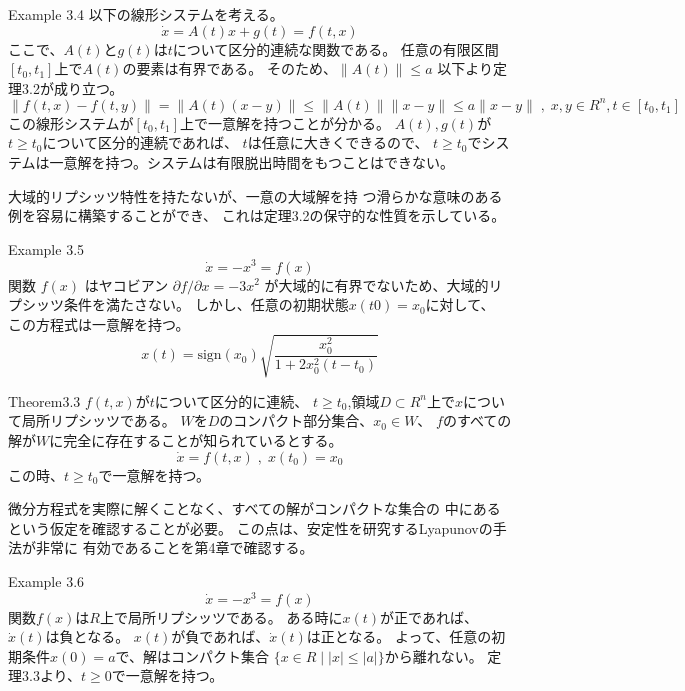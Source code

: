 \documentclass{jsarticle}
\begin{document}
Example 3.4
以下の線形システムを考える。
\begin{equation*}
  \dot x = A(t)x + g(t)=f(t,x)
\end{equation*}
ここで、$A(t)$と$g(t)$は$t$について区分的連続な関数である。
任意の有限区間$[t_0,t_1]$上で$A(t)$の要素は有界である。
そのため、$\|A(t)\|\leq a$
以下より定理3.2が成り立つ。
\begin{equation*}
  \|f(t,x)-f(t,y)\|=\|A(t)(x-y)\|\leq \|A(t)\|\|x-y\|\leq a\|x-y\|
  \;,\;x,y \in R^n,t\in [t_0,t_1]
\end{equation*}
この線形システムが$[t_0,t_1]$上で一意解を持つことが分かる。
$A(t),g(t)$が$t\geq t_0$について区分的連続であれば、
$t$は任意に大きくできるので、
$t\geq t_0$でシステムは一意解を持つ。システムは有限脱出時間をもつことはできない。

大域的リプシッツ特性を持たないが、一意の大域解を持
つ滑らかな意味のある例を容易に構築することができ、
これは定理3.2の保守的な性質を示している。

Example 3.5
\begin{equation*}
  \dot x = -x^3 = f(x)
\end{equation*}
関数 $f(x)$ はヤコビアン $\partial f/\partial x = -3x^2$
が大域的に有界でないため、大域的リプシッツ条件を満たさない。
しかし、任意の初期状態$x(t0)=x_0$に対して、
この方程式は一意解を持つ。
\begin{equation*}
  x(t)=\text{sign}(x_0)\sqrt{
    \frac{x_0^2}{1+2x_0^2(t-t_0)}
  }
\end{equation*}

\begin{itembox}[l]{Theorem3.3}
  $f(t,x)$が$t$について区分的に連続、
  $t\geq t_0$,領域$D\subset R^n$上で$x$について局所リプシッツである。
  $W$を$D$のコンパクト部分集合、$x_0\in W$、
  $f$のすべての解が$W$に完全に存在することが知られているとする。
  \begin{equation*}
    \dot x = f(t,x)\;,\;x(t_0)=x_0
  \end{equation*}
  この時、$t\geq t_0$で一意解を持つ。  
\end{itembox}
微分方程式を実際に解くことなく、すべての解がコンパクトな集合の
中にあるという仮定を確認することが必要。
この点は、安定性を研究するLyapunovの手法が非常に
有効であることを第4章で確認する。

Example 3.6
\begin{equation*}
  \dot x = -x^3 = f(x)
\end{equation*}
関数$f(x)$は$R$上で局所リプシッツである。
ある時に$x(t)$が正であれば、$\dot x(t)$は負となる。
$x(t)$が負であれば、$\dot x(t)$は正となる。
よって、任意の初期条件$x(0)=a$で、解はコンパクト集合
$\{x\in R \mid |x|\leq |a|\}$から離れない。
定理3.3より、$t\geq 0$で一意解を持つ。
\end{document}

